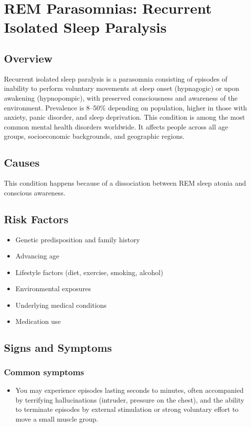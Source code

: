 \chapter{REM Parasomnias: Recurrent Isolated Sleep Paralysis}
\label{sec:Recurrent Isolated Sleep Paralysis}

\section{Overview}
Recurrent isolated sleep paralysis is a parasomnia consisting of episodes of inability to perform voluntary movements at sleep onset (hypnagogic) or upon awakening (hypnopompic), with preserved consciousness and awareness of the environment. Prevalence is 8--50\% depending on population, higher in those with anxiety, panic disorder, and sleep deprivation. This condition is among the most common mental health disorders worldwide. It affects people across all age groups, socioeconomic backgrounds, and geographic regions.
\section{Causes}
This condition happens because of a dissociation between REM sleep atonia and conscious awareness.     
\section{Risk Factors}

\begin{itemize}[noitemsep]
  \item Genetic predisposition and family history
  \item Advancing age
  \item Lifestyle factors (diet, exercise, smoking, alcohol)
  \item Environmental exposures
  \item Underlying medical conditions
  \item Medication use
\end{itemize}
\section{Signs and Symptoms}

\subsection{Common symptoms}
\begin{itemize}[noitemsep]
  \item You may experience episodes lasting seconds to minutes, often accompanied by terrifying hallucinations (intruder, pressure on the chest), and the ability to terminate episodes by external stimulation or strong voluntary effort to move a small muscle group. 
  \end{itemize}


